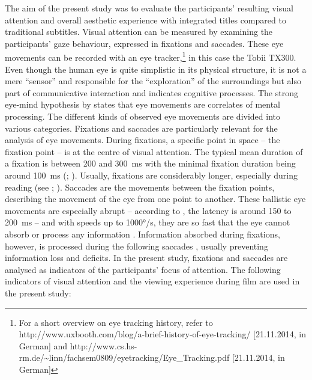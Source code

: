 \documentclass[output=paper]{langsci/langscibook}
\begin{document}
The aim of the present study was to evaluate the participants' resulting visual attention and overall aesthetic experience with integrated titles compared to traditional subtitles. Visual attention can be measured by examining the participants' gaze behaviour, expressed in fixations and saccades. These eye movements can be recorded with an eye tracker,\footnote{For a short overview on eye tracking history, refer to http://www.uxbooth.com/blog/a-brief-history-of-eye-tracking/ [21.11.2014, in German] and http://www.cs.hs-rm.de/\~{}linn/fachsem0809/eyetracking/Eye\_Tracking.pdf [21.11.2014, in German]} in this case the Tobii TX300. Even though the human eye is quite simplistic in its physical structure, it is not a mere ``sensor'' \citep[1]{Joos2002} and responsible for the ``exploration'' of the surroundings but also part of communicative interaction and indicates cognitive processes. The strong eye-mind hypothesis by \citet{justcarpenter1980} states that eye movements are correlates of mental processing. The different kinds of observed eye movements are divided into various categories. Fixations and saccades are particularly relevant for the analysis of eye movements. During fixations, a specific point in space -- the fixation point -- is at the centre of visual attention. The typical mean duration of a fixation is between 200 and 300~ms with the minimal fixation duration being around 100~ms (\citealt[373]{rayner1998}; \citealt[2]{flothow2009}). Usually, fixations are considerably longer, especially during reading (see \citealt{rayner1998}; \citealt{jakobsen2008}). Saccades are the movements between the fixation points, describing the movement of the eye from one point to another. These ballistic eye movements are especially abrupt -- according to \citet[17]{joos2005}, the latency is around 150 to 200~ms -- and with speeds up to 1000°/s, they are so fast that the eye cannot absorb or process any information \citep[4]{flothow2009}. Information absorbed during fixations, however, is processed during the following saccades \citep[6]{kowler2006}, usually preventing information loss and deficits. In the present study, fixations and saccades are analysed as indicators of the participants' focus of attention. The following indicators of visual attention and the viewing experience during film are used in the present study:
\end{document}
